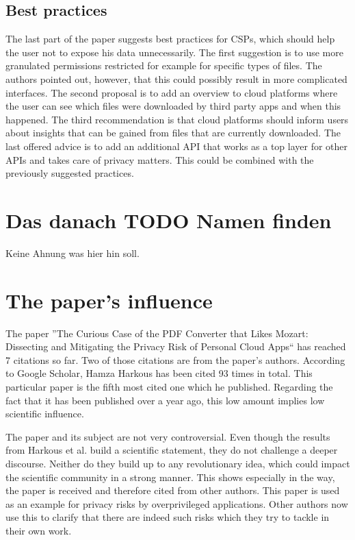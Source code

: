 \documentclass[11pt,twocolumn,a4paper,DIV=calc]{scrartcl}
\begin{document}
\subsection{Best practices}

The last part of the paper suggests best practices for CSPs, which should help the user not to expose his data unnecessarily. 
The first suggestion is to use more granulated permissions restricted for example for specific types of files. 
The authors pointed out, however, that this could possibly result in more complicated interfaces. 
The second proposal is to add an overview to cloud platforms where the user can see which files were downloaded by third party apps and when this happened. 
The third recommendation is that cloud platforms should inform users about insights that can be gained from files that are currently downloaded. 
The last offered advice is to add an additional API that works as a top layer for other APIs and takes care of privacy matters. This could be combined with the previously suggested practices.
\section{Das danach TODO Namen finden}
Keine Ahnung was hier hin soll.

\section{The paper's influence}

The paper ''The Curious Case of the PDF Converter that Likes Mozart: Dissecting and Mitigating the Privacy Risk of Personal Cloud Apps`` has reached 7 citations so far.
Two of those citations are from the paper's authors.
According to Google Scholar, Hamza Harkous has been cited 93 times in total.
This particular paper is the fifth most cited one which he published.
Regarding the fact that it has been published over a year ago, this low amount implies low scientific influence.

The paper and its subject are not very controversial.
Even though the results from Harkous et al. build a scientific statement, they do not challenge a deeper discourse.
Neither do they build up to any revolutionary idea, which could impact the scientific community in a strong manner.
This shows especially in the way, the paper is received and therefore cited from other authors.
This paper is used as an example for privacy risks by overprivileged applications.
Other authors now use this to clarify that there are indeed such risks which they try to tackle in their own work.
\end{document}
